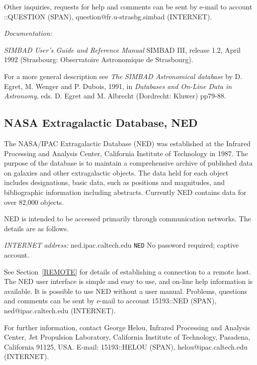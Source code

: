 \documentclass[twoside,11pt]{article}
\newcommand{\xlabel}[1]{}
\begin{document}
Other inquiries, requests for help and comments can be sent by e-mail
to account 
::QUESTION (SPAN), question@fr.u-strasbg.simbad
(INTERNET).

{\it Documentation:}

{\it SIMBAD User's Guide and Reference Manual} SIMBAD III, release 1.2,
April 1992 (Strasbourg: Observatoire Astronomique de Strasbourg).

For a more general description see {\it The SIMBAD Astronomical 
database} by D. Egret, M. Wenger and P. Dubois, 1991, in {\it Databases 
and On-Line Data in Astronomy}, eds. D. Egret and M. Albrecht 
(Dordrecht: Kluwer) pp79-88.

\subsection{NASA Extragalactic Database, NED
\xlabel{nasa_extragalactic_database_ned}}

The NASA/IPAC Extragalactic Database (NED) was established at the 
Infrared Processing and Analysis Center, California Institute of 
Technology in 1987. The purpose of the database is to maintain a 
comprehensive archive of published data on galaxies and other 
extragalactic objects. The data held for each object includes 
designations, basic data, such as positions and magnitudes, and 
bibliographic information including abstracts. Currently NED contains
data for over 82,000 objects.

NED is intended to be accessed primarily through communication networks.
The details are as follows.

{\it INTERNET address:} ned.ipac.caltech.edu
 \verb-NED-
 No password required; captive account.

See Section~\ref{REMOTE} for details of establishing a connection to
a remote host. The NED user interface is simple and easy to use,
and on-line help information is available. It is possible to use NED
without a user manual. Problems, questions and comments can be sent by
e-mail to account 15193::NED (SPAN), ned@ipac.caltech.edu (INTERNET).

For further information, contact George Helou, Infrared Processing and
Analysis Center, Jet Propulsion Laboratory, California Institute of
Technology, Pasadena, California 91125, USA. E-mail: 15193::HELOU 
(SPAN), helou@ipac.caltech.edu (INTERNET).
\end{document}
